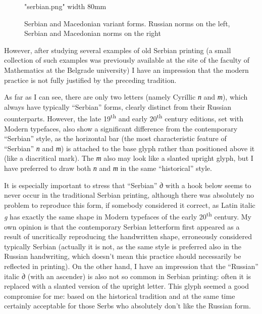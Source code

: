 \documentclass[12pt,a4paper,openany]{book}
\begin{document}
\begin{figure}

\centerline{\XeTeXpicfile "serbian.png" width 80mm}

\caption{Serbian and Macedonian variant forms. Russian norms on the left,
Serbian and Macedonian norms on the right}
\label{fig:serbian}

\end{figure}

However, after studying several examples of old Serbian printing (a small
collection of such examples was previously available at the site of the
faculty of Mathematics at the Belgrade university) I have an impression that
the modern practice is not fully justified by the preceding tradition.

As far as I can see, there are only two letters (namely Cyrillic \textit{п}
and \textit{т}), which always have typically “Serbian” forms, clearly
distinct from their Russian counterparts. However, the late
19\textsuperscript{th} and early 20\textsuperscript{th} century editions,
set with Modern typefaces, also show a significant difference from the
contemporary “Serbian” style, as the horizontal bar (the most
characteristic feature of “Serbian” \textit{п} and \textit{т}) is attached
to the base glyph rather than positioned above it (like a diacritical
mark). The \textit{т} also may look like a slanted upright glyph, but I
have preferred to draw both \textit{п} and \textit{т} in the same
“historical” style.

It is especially important to stress that “Serbian” \textit{д} with a hook
below seems to never occur in the traditional Serbian printing, although
there was absolutely no problem to reproduce this form, if somebody
considered it correct, as Latin italic \textit{g} has exactly the same
shape in Modern typefaces of the early 20\textsuperscript{th} century. My
own opinion is that the contemporary Serbian letterform first appeared as a
result of uncritically reproducing the handwritten shape, erroneously
considered typically Serbian (actually it is not, as the same style is
preferred also in the Russian handwriting, which doesn’t mean this practice
should necessarily be reflected in printing). On the other hand, I have an
impression that the “Russian” italic \textit{д} (with an ascender) is also
not so common in Serbian printing: often it is replaced with a slanted
version of the upright letter. This glyph seemed a good compromise for me:
based on the historical tradition and at the same time certainly acceptable
for those Serbs who absolutely don’t like the Russian form.
\end{document}
